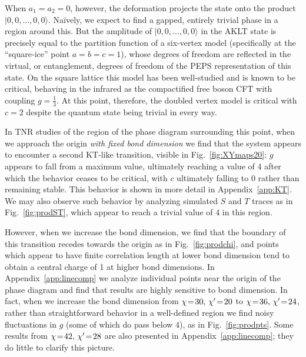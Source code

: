 \documentclass[aps,prb,letterpaper,superscriptaddress,twocolumn,showpacs,floatfix,10pt]{revtex4-1}
\begin{document}
When $a_1 = a_2 = 0$, however, the deformation projects the state onto the
product $|0,0,\ldots,0,0\rangle$. Na\"ively, we expect to find a gapped,
entirely trivial phase in a region around this.  But the amplitude of
$|0,0,\ldots,0,0\rangle$ in the AKLT state is precisely
equal to the partition function
of a six-vertex model (specifically at the ``square-ice'' point
$a=b=c=1$), whose degrees of freedom are reflected in the
virtual, or entanglement, degrees of freedom of the PEPS
representation of this state.  On the square
lattice this model has been well-studied and is known to be critical,
behaving in the infrared as the compactified free boson CFT with coupling
$g=\frac{1}{3}$.  At this point,
therefore, the doubled vertex model is critical with $c=2$ despite the
quantum state being trivial in every way.

In TNR studies of the region of the phase diagram surrounding this
point, when we approach the origin 
\textit{with fixed bond dimension}
we find that the system appears to encounter a second
KT-like transition, visible in Fig.~\ref{fig:XYmaps20}: $g$ appears to fall
from a maximum value, ultimately reaching a value of 4 after which the behavior
ceases to be critical, with $c$ ultimately falling to 0 rather than remaining
stable. This behavior is shown in more detail in Appendix~\ref{app:KT}.
We may also observe such behavior by analyzing simulated $S$ and $T$ traces
as in Fig.~\ref{fig:prodST}, which appear to reach a trivial value of 4 in
this region.

However, when we increase the bond dimension, we find that the boundary of
this transition recedes towards the origin as in Fig.~\ref{fig:prodchi},
and points which appear to have
finite correlation length at lower bond dimension tend to obtain a central
charge of 1 at higher bond dimensions.
In Appendix~\ref{app:linecomp} we analyze individual points
near the origin of the phase diagram and find that results are highly sensitive
to bond dimension. In fact, when we
increase the bond dimension from $\chi\nobreak\!=\nobreak\!30, \,\chi'\nobreak\!=\nobreak\!20$ to $\chi\nobreak\!=\nobreak\!36, \,\chi'\nobreak\!=\nobreak\!24$,
rather than straightforward behavior in a well-defined region we find noisy
fluctuations in $g$ (some of which do pass below 4), as in
Fig.~\ref{fig:prodpts}. Some results from $\chi\nobreak\!=\nobreak\!42, \,\chi'\nobreak\!=\nobreak\!28$ are also
presented in Appendix~\ref{app:linecomp}; they do little to clarify this
picture.
\end{document}
